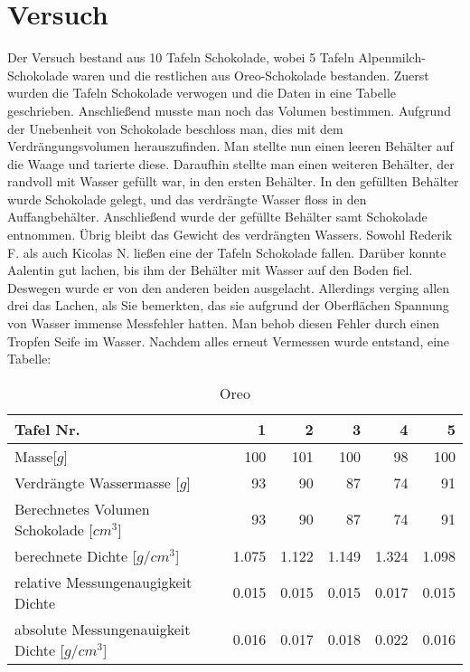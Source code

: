 \documentclass[12pt]{scrartcl}
\begin{document}
\section{Versuch}
Der Versuch bestand aus 10 Tafeln Schokolade, wobei 5 Tafeln Alpenmilch-Schokolade waren und die restlichen aus Oreo-Schokolade bestanden. Zuerst wurden die Tafeln Schokolade verwogen und die Daten in eine Tabelle geschrieben. Anschließend musste man noch das Volumen bestimmen. Aufgrund der Unebenheit von Schokolade beschloss man, dies mit dem Verdrängungsvolumen herauszufinden. Man stellte nun einen leeren Behälter auf die Waage und tarierte diese. Daraufhin stellte man einen weiteren Behälter, der randvoll mit Wasser gefüllt war, in den ersten Behälter. In den gefüllten Behälter wurde Schokolade gelegt, und das verdrängte Wasser floss in den Auffangbehälter. Anschließend wurde der gefüllte Behälter samt Schokolade entnommen. Übrig bleibt das Gewicht des verdrängten Wassers. Sowohl Rederik F. als auch Kicolas N. ließen eine der Tafeln Schokolade fallen. Darüber konnte Aalentin gut lachen, bis ihm der Behälter mit Wasser auf den Boden fiel. Deswegen wurde er von den anderen beiden ausgelacht. Allerdings verging allen drei das Lachen, als Sie bemerkten, das sie aufgrund der Oberflächen Spannung von Wasser immense Messfehler hatten. Man behob diesen Fehler durch einen Tropfen Seife im Wasser. Nachdem alles erneut Vermessen wurde entstand, eine Tabelle:
	\begin{table}[h!]
	  \center
	  \caption{Oreo}
      \label{tab:oreo}	  
      \begin{tabular}{l|r|r|r|r|r}
      \toprule
      Tafel Nr. & 1 & 2 & 3 & 4 & 5\\
      \midrule
      Masse[$g$] & 100 & 101 & 100 & 98 & 100\\
      \midrule
      Verdrängte Wassermasse [$g$] & 93 & 90 & 87 & 74 & 91\\
      \midrule
      Berechnetes Volumen Schokolade [$cm^3$] & 93 & 90 & 87 & 74 & 91\\
      \midrule
      berechnete Dichte [$g/cm^3$] & 1.075 & 1.122 & 1.149 & 1.324 & 1.098 \\
      \midrule
      relative Messungenaugigkeit Dichte & 0.015 & 0.015 & 0.015 & 0.017 & 0.015 \\
      \midrule
      absolute Messungenauigkeit Dichte [$g/cm^3$] & 0.016 & 0.017 & 0.018 & 0.022 & 0.016 \\
      \bottomrule
      \end{tabular}
	\end{table}
\end{document}
